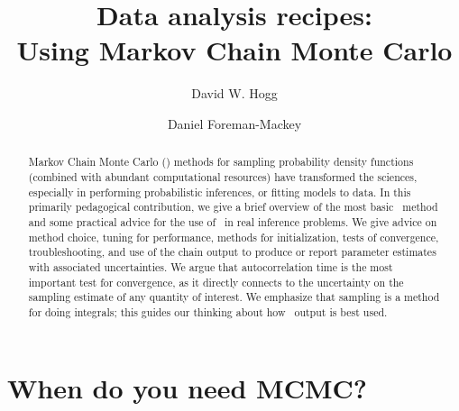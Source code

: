 \documentclass[modern]{aastex61}
\newcommand{\MCMC}{\acronym{MCMC}}
\begin{document}
\sloppy\sloppypar\raggedbottom\frenchspacing\thispagestyle{plain}%
%
\title{Data analysis recipes:\\
       Using Markov Chain Monte Carlo%
}%

\author[0000-0003-2866-9403]{David W. Hogg}

\author[0000-0002-9328-5652]{Daniel Foreman-Mackey}

\begin{abstract}\noindent
Markov Chain Monte Carlo (\MCMC) methods for sampling probability
density functions (combined with abundant computational resources)
have transformed the sciences, especially in performing probabilistic
inferences, or fitting models to data.
In this primarily pedagogical contribution,
we give a brief overview of the most basic \MCMC\ method and some
practical advice for the use of \MCMC\ in real inference problems.
We give advice on method choice, tuning for performance,
methods for initialization, tests of convergence, troubleshooting, and use of the chain
output to produce or report parameter estimates with associated uncertainties.
We argue that autocorrelation time is the most important test for convergence,
as it directly connects to the uncertainty on the sampling estimate of any
quantity of interest.
We emphasize that sampling is a method for doing integrals; this guides our thinking
about how \MCMC\ output is best used.
\end{abstract}

\section{When do you need MCMC?}\label{sec:when}
\end{document}
